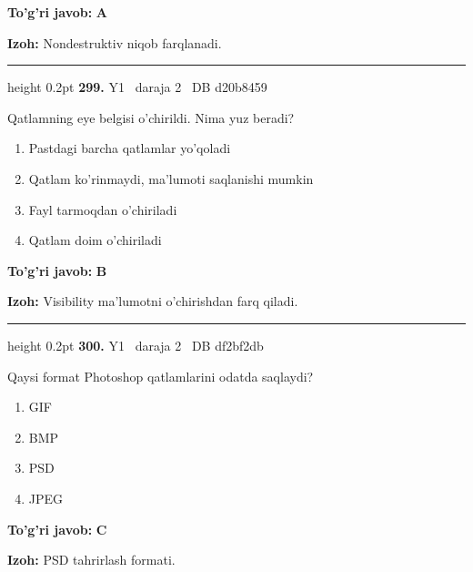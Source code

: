 \documentclass[10pt,a4paper,oneside]{article}
\begin{document}
\begin{tcolorbox}[enhanced,breakable,colback=teal!4,colframe=teal!45!black,boxrule=0.45pt,arc=1.2mm,left=2.8mm,right=2.8mm,top=2mm,bottom=2mm,before skip=2mm,after skip=2mm]
\textbf{\color{teal}To'g'ri javob:} \textbf{A}
\par\smallskip
\textbf{Izoh:} Nondestruktiv niqob farqlanadi.
\end{tcolorbox}
\vspace{2mm}\hrule height 0.2pt \vspace{4mm}
\hypertarget{q299}{\textbf{\color{ink}299.}}  {\color{muted}\scriptsize Y1 \textbullet\ daraja 2 \textbullet\ DB d20b8459}
\par
Qatlamning eye belgisi o'chirildi. Nima yuz beradi?
\begin{enumerate}[label=\Alph*),leftmargin=9mm]
\item Pastdagi barcha qatlamlar yo'qoladi
\item Qatlam ko'rinmaydi, ma'lumoti saqlanishi mumkin
\item Fayl tarmoqdan o'chiriladi
\item Qatlam doim o'chiriladi
\end{enumerate}
\begin{tcolorbox}[enhanced,breakable,colback=teal!4,colframe=teal!45!black,boxrule=0.45pt,arc=1.2mm,left=2.8mm,right=2.8mm,top=2mm,bottom=2mm,before skip=2mm,after skip=2mm]
\textbf{\color{teal}To'g'ri javob:} \textbf{B}
\par\smallskip
\textbf{Izoh:} Visibility ma'lumotni o'chirishdan farq qiladi.
\end{tcolorbox}
\vspace{2mm}\hrule height 0.2pt \vspace{4mm}
\hypertarget{q300}{\textbf{\color{ink}300.}}  {\color{muted}\scriptsize Y1 \textbullet\ daraja 2 \textbullet\ DB df2bf2db}
\par
Qaysi format Photoshop qatlamlarini odatda saqlaydi?
\begin{enumerate}[label=\Alph*),leftmargin=9mm]
\item GIF
\item BMP
\item PSD
\item JPEG
\end{enumerate}
\begin{tcolorbox}[enhanced,breakable,colback=teal!4,colframe=teal!45!black,boxrule=0.45pt,arc=1.2mm,left=2.8mm,right=2.8mm,top=2mm,bottom=2mm,before skip=2mm,after skip=2mm]
\textbf{\color{teal}To'g'ri javob:} \textbf{C}
\par\smallskip
\textbf{Izoh:} PSD tahrirlash formati.
\end{tcolorbox}
\end{document}
